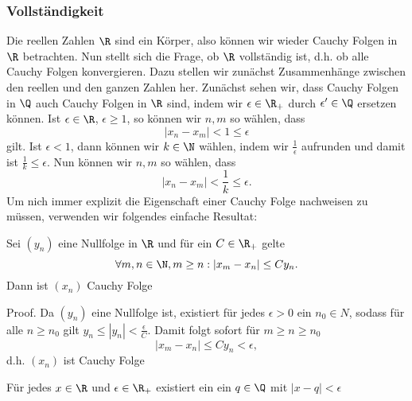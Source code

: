 \documentclass[letterpaper,10pt,english]{jupyterBook}
\begin{document}
\subsubsection{Vollständigkeit}
\label{\detokenize{grundlagen/zahlensysteme:vollstandigkeit}}
Die reellen Zahlen \(\R\) sind ein Körper, also können wir wieder Cauchy Folgen in \(\R\) betrachten. Nun stellt sich die Frage, ob \(\R\) vollständig ist, d.h. ob alle Cauchy Folgen konvergieren. Dazu stellen wir zunächst Zusammenhänge zwischen den reellen und den ganzen Zahlen her. Zunächst sehen wir, dass Cauchy Folgen in \(\Q\) auch Cauchy Folgen in \(\R\) sind, indem wir \(\epsilon \in \R_+\) durch \(\epsilon' \in \Q\) ersetzen können. Ist \(\epsilon \in \R\), \(\epsilon \geq 1\), so können wir \(n,m\) so wählen, dass
\begin{equation*}
|x_n -x_m| < 1 \leq \epsilon
\end{equation*}
gilt. Ist \(\epsilon < 1\), dann können wir \(k \in \N\) wählen, indem wir \(\frac{1}\epsilon\) aufrunden und damit ist
\(\frac{1}k \leq \epsilon\). Nun können wir \(n,m\) so wählen, dass
\begin{equation*}
|x_n -x_m| < \frac{1}k \leq \epsilon.
\end{equation*}
Um nich immer explizit die Eigenschaft einer Cauchy Folge nachweisen zu müssen, verwenden wir folgendes einfache Resultat:
\label{grundlagen/zahlensysteme:lemma-22}
\begin{lemma}{}{}



Sei \((y_n)\) eine Nullfolge in \(\R\) und für ein \(C \in \R_+\) gelte
\begin{equation*}
\forall m,n \in \N, m \geq n: |x_m-x_n| \leq C y_n.
\end{equation*}
Dann ist \((x_n)\) Cauchy Folge
\end{lemma}

\begin{emphBox}{}{}
Proof.  Da \((y_n)\) eine Nullfolge ist, existiert für jedes \(\epsilon > 0\) ein \(n_0 \in N\), sodass für alle \(n \geq n_0\) gilt \(y_n \leq |y_n| < \frac{\epsilon}C\). Damit folgt sofort für \(m \geq n \geq n_0\)
\begin{equation*}
|x_m-x_n| \leq C y_n < \epsilon,
\end{equation*}
d.h. \((x_n)\) ist Cauchy Folge
\end{emphBox}
\label{grundlagen/zahlensysteme:lemma-23}
\begin{lemma}{}{}



Für jedes \(x \in \R\) und \(\epsilon \in \R_+\) existiert ein ein \(q \in \Q\) mit \(|x-q|<\epsilon\)
\end{lemma}
\end{document}
